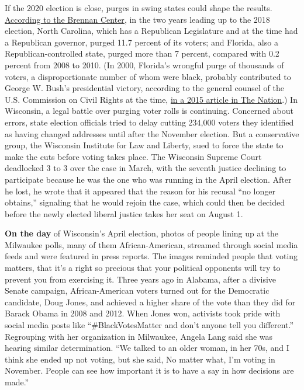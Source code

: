 If the 2020 election is close, purges in swing states could shape the
results.
\href{https://www.brennancenter.org/our-work/analysis-opinion/florida-georgia-north-carolina-still-purging-voters-high-rates}{According
to the Brennan Center}, in the two years leading up to the 2018
election, North Carolina, which has a Republican Legislature and at the
time had a Republican governor, purged 11.7 percent of its voters; and
Florida, also a Republican-controlled state, purged more than 7 percent,
compared with 0.2 percent from 2008 to 2010. (In 2000, Florida's
wrongful purge of thousands of voters, a disproportionate number of whom
were black, probably contributed to George W. Bush's presidential
victory, according to the general counsel of the U.S. Commission on
Civil Rights at the time,
\href{https://www.thenation.com/article/archive/how-the-2000-election-in-florida-led-to-a-new-wave-of-voter-disenfranchisement/}{in
a 2015 article in The Nation}.) In Wisconsin, a legal battle over
purging voter rolls is continuing. Concerned about errors, state
election officials tried to delay cutting 234,000 voters they identified
as having changed addresses until after the November election. But a
conservative group, the Wisconsin Institute for Law and Liberty, sued to
force the state to make the cuts before voting takes place. The
Wisconsin Supreme Court deadlocked 3 to 3 over the case in March, with
the seventh justice declining to participate because he was the one who
was running in the April election. After he lost, he wrote that it
appeared that the reason for his recusal ``no longer obtains,''
signaling that he would rejoin the case, which could then be decided
before the newly elected liberal justice takes her seat on August 1.

\textbf{On the day} of Wisconsin's April election, photos of people
lining up at the Milwaukee polls, many of them African-American,
streamed through social media feeds and were featured in press reports.
The images reminded people that voting matters, that it's a right so
precious that your political opponents will try to prevent you from
exercising it. Three years ago in Alabama, after a divisive Senate
campaign, African-American voters turned out for the Democratic
candidate, Doug Jones, and achieved a higher share of the vote than they
did for Barack Obama in 2008 and 2012. When Jones won, activists took
pride with social media posts like ``\#BlackVotesMatter and don't anyone
tell you different.'' Regrouping with her organization in Milwaukee,
Angela Lang said she was hearing simi­lar determination. ``We talked to
an older woman, in her 70s, and I think she ended up not voting, but she
said, No matter what, I'm voting in November. People can see how
important it is to have a say in how decisions are made.''

